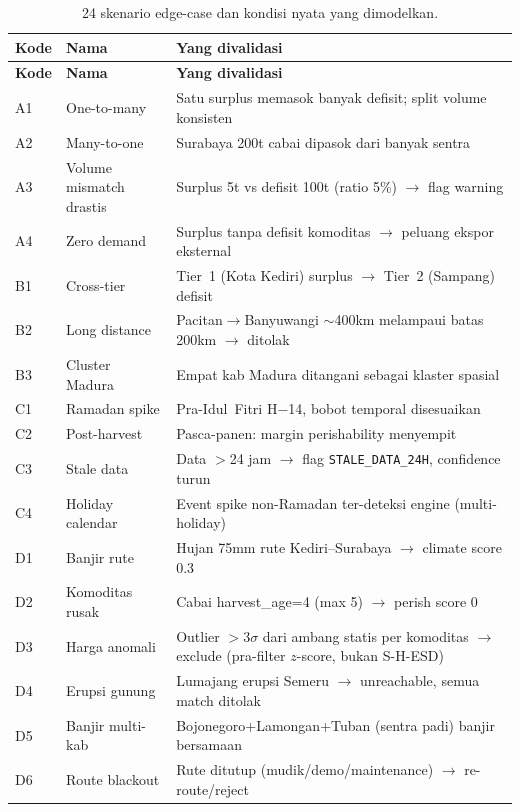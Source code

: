 \documentclass[11pt,a4paper]{article}
\newcommand{\code}[1]{\texttt{#1}}
\begin{document}
\begin{center}
\begin{longtable}{p{0.9cm}p{4.4cm}p{8.0cm}}
\caption{24 skenario edge-case dan kondisi nyata yang dimodelkan.}\label{tab:skenario}\\
\toprule
\textbf{Kode} & \textbf{Nama} & \textbf{Yang divalidasi} \\
\midrule
\endfirsthead
\toprule
\textbf{Kode} & \textbf{Nama} & \textbf{Yang divalidasi} \\
\midrule
\endhead
A1 & One-to-many & Satu surplus memasok banyak defisit; split volume konsisten \\
A2 & Many-to-one & Surabaya 200t cabai dipasok dari banyak sentra \\
A3 & Volume mismatch drastis & Surplus 5t vs defisit 100t (ratio 5\%) $\rightarrow$ flag warning \\
A4 & Zero demand & Surplus tanpa defisit komoditas $\rightarrow$ peluang ekspor eksternal \\
B1 & Cross-tier & Tier~1 (Kota Kediri) surplus $\rightarrow$ Tier~2 (Sampang) defisit \\
B2 & Long distance & Pacitan$\rightarrow$Banyuwangi $\sim$400km melampaui batas 200km $\rightarrow$ ditolak \\
B3 & Cluster Madura & Empat kab Madura ditangani sebagai klaster spasial \\
C1 & Ramadan spike & Pra-Idul~Fitri H$-$14, bobot temporal disesuaikan \\
C2 & Post-harvest & Pasca-panen: margin perishability menyempit \\
C3 & Stale data & Data $>$24 jam $\rightarrow$ flag \code{STALE\_DATA\_24H}, confidence turun \\
C4 & Holiday calendar & Event spike non-Ramadan ter-deteksi engine (multi-holiday) \\
D1 & Banjir rute & Hujan 75mm rute Kediri--Surabaya $\rightarrow$ climate score 0.3 \\
D2 & Komoditas rusak & Cabai harvest\_age=4 (max 5) $\rightarrow$ perish score 0 \\
D3 & Harga anomali & Outlier $>3\sigma$ dari ambang statis per komoditas $\rightarrow$ exclude (pra-filter $z$-score, bukan S-H-ESD) \\
D4 & Erupsi gunung & Lumajang erupsi Semeru $\rightarrow$ unreachable, semua match ditolak \\
D5 & Banjir multi-kab & Bojonegoro+Lamongan+Tuban (sentra padi) banjir bersamaan \\
D6 & Route blackout & Rute ditutup (mudik/demo/maintenance) $\rightarrow$ re-route/reject \\

\end{longtable}
\end{center}
\end{document}
